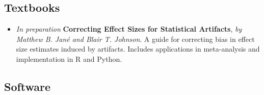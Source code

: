 \documentclass[
  letterpaper,
  DIV=11,
  numbers=noendperiod]{scrartcl}
\providecommand{\tightlist}{%
  \setlength{\itemsep}{0pt}\setlength{\parskip}{0pt}}\usepackage{longtable,booktabs,array}
\begin{document}
\hypertarget{textbooks}{%
\subsection{Textbooks}\label{textbooks}}

\begin{itemize}
\tightlist
\item
  \emph{In preparation} \textbar{} \textbf{Correcting Effect Sizes for
  Statistical Artifacts}, \emph{by Matthew B. Jané and Blair T.
  Johnson}. A guide for correcting bias in effect size estimates induced
  by artifacts. Includes applications in meta-analysis and
  implementation in R and Python.
\end{itemize}

\hypertarget{software}{%
\subsection{Software}\label{software}}
\end{document}
